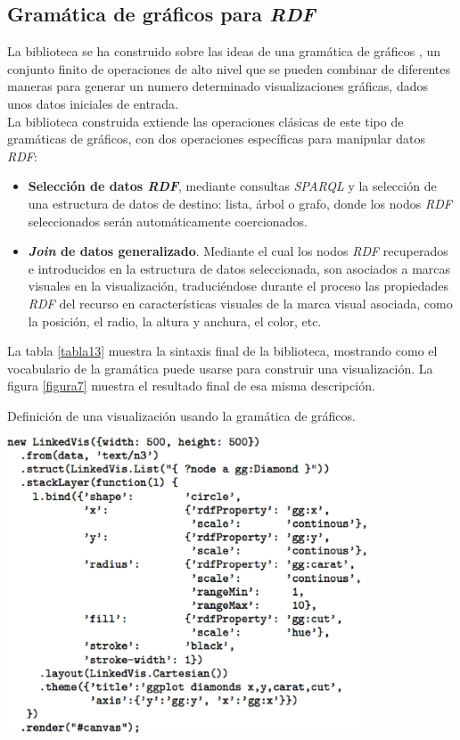 \subsection{Gram\'atica de gr\'aficos para \textit{RDF}}

La biblioteca se ha construido sobre las ideas de una gram\'atica de gr\'aficos \cite{wilkinson2012grammar}, un conjunto finito de operaciones de alto nivel que se pueden combinar de diferentes maneras para generar un numero determinado visualizaciones gr\'aficas, dados unos datos iniciales de entrada.\\
La biblioteca construida extiende las operaciones cl\'asicas de este tipo de gram\'aticas de gr\'aficos,  con dos operaciones espec\'ificas para manipular datos \textit{RDF}:

\begin{itemize}
\item \textbf{Selecci\'on de datos \textit{RDF}}, mediante consultas \textit{SPARQL} y la selecci\'on de una estructura de datos de destino: lista, \'arbol o grafo, donde los nodos \textit{RDF} seleccionados ser\'an autom\'aticamente coercionados.
\item \textbf{\textit{Join} de datos generalizado}. Mediante el cual los nodos \textit{RDF} recuperados e introducidos en la estructura de datos seleccionada, son asociados a marcas visuales en la visualizaci\'on, traduci\'endose durante el proceso las propiedades \textit{RDF} del recurso en caracter\'isticas visuales de la marca visual asociada, como la posici\'on, el radio, la altura y anchura, el color, etc.
\end{itemize}

La tabla \ref{tabla13} muestra la sintaxis final de la biblioteca, mostrando como el vocabulario de la gram\'atica puede usarse para construir una visualizaci\'on. La figura \ref{figura7} muestra el resultado final de esa misma descripci\'on.\\

\begin{table}
\vspace{2.4in}
\caption{Definici\'on de una visualizaci\'on usando la gram\'atica de gr\'aficos.}
\includegraphics[width=0.8\textwidth]{tabla13}
\label{tabla13}
\end{table}

